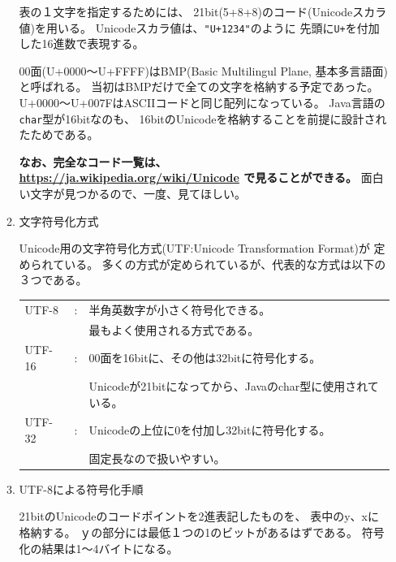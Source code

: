 \documentclass[uplatex]{jsarticle}
\begin{document}
\begin{enumerate}
\begin{enumerate}
表の１文字を指定するためには、
21bit(5+8+8)のコード(Unicodeスカラ値)を用いる。
Unicodeスカラ値は、\verb/"U+1234"/のように
先頭に\verb/U+/を付加した16進数で表現する。

00面(U+0000〜U+FFFF)はBMP(Basic Multilingul Plane, 基本多言語面)と呼ばれる。
当初はBMPだけで全ての文字を格納する予定であった。
U+0000〜U+007FはASCIIコードと同じ配列になっている。
Java言語の\verb/char/型が16bitなのも、
16bitのUnicodeを格納することを前提に設計されたためである。

{\bf なお、完全なコード一覧は、
\url{https://ja.wikipedia.org/wiki/Unicode}
で見ることができる。}
面白い文字が見つかるので、一度、見てほしい。

\item 文字符号化方式

Unicode用の文字符号化方式(UTF:Unicode Transformation Format)が
定められている。
多くの方式が定められているが、代表的な方式は以下の３つである。

\begin{tabular}{l c l }
UTF-8  & : & 半角英数字が小さく符号化できる。\\
       &   & 最もよく使用される方式である。\\
UTF-16 & : & 00面を16bitに、その他は32bitに符号化する。\\
       &   & Unicodeが21bitになってから、Javaのchar型に使用されている。\\
UTF-32 & : & Unicodeの上位に0を付加し32bitに符号化する。\\
       &   & 固定長なので扱いやすい。\\
\end{tabular}

\item UTF-8による符号化手順

21bitのUnicodeのコードポイントを2進表記したものを、
表中のy、xに格納する。
ｙの部分には最低１つの1のビットがあるはずである。
符号化の結果は1〜4バイトになる。


\end{enumerate}
\end{enumerate}
\end{document}
